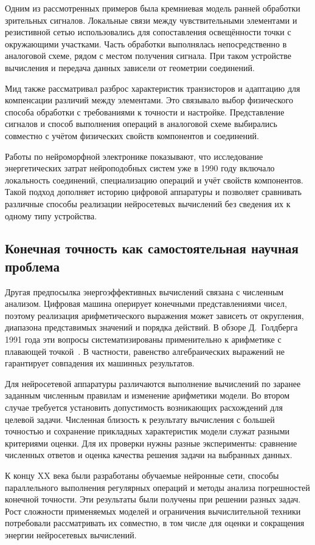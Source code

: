 Одним из рассмотренных примеров была кремниевая модель
ранней обработки зрительных сигналов. Локальные связи
между чувствительными элементами и резистивной сетью
использовались для сопоставления освещённости точки
с окружающими участками. Часть обработки выполнялась
непосредственно в аналоговой схеме, рядом с местом
получения сигнала. При таком устройстве вычисления
и передача данных зависели от геометрии соединений.

Мид также рассматривал разброс характеристик транзисторов
и адаптацию для компенсации различий между элементами.
Это связывало выбор физического способа обработки
с требованиями к точности и настройке. Представление сигналов
и способ выполнения операций в аналоговой схеме выбирались
совместно с учётом физических свойств компонентов и соединений.

Работы по нейроморфной электронике показывают,
что исследование энергетических затрат нейроподобных
систем уже в 1990 году включало локальность соединений,
специализацию операций и учёт свойств компонентов.
Такой подход дополняет историю цифровой аппаратуры
и позволяет сравнивать различные способы реализации
нейросетевых вычислений без сведения их к одному типу устройства.

\subsection{Конечная точность как самостоятельная научная проблема}

Другая предпосылка энергоэффективных вычислений связана с численным анализом.
Цифровая машина оперирует конечными представлениями чисел, поэтому
реализация арифметического выражения может зависеть от округления,
диапазона представимых значений и порядка действий. В обзоре Д.~Голдберга
1991 года эти вопросы систематизированы применительно к арифметике
с плавающей точкой~\cite{goldberg1991}. В частности, равенство
алгебраических выражений не гарантирует совпадения их машинных результатов.

Для нейросетевой аппаратуры различаются выполнение вычислений по заранее
заданным численным правилам и изменение арифметики модели. Во втором случае требуется установить допустимость возникающих
расхождений для целевой задачи. Численная близость к результату вычисления
с большей точностью и сохранение прикладных характеристик модели
служат разными критериями оценки. Для их проверки нужны разные эксперименты:
сравнение численных ответов и оценка качества решения задачи на выбранных
данных.

К концу XX века были разработаны обучаемые нейронные сети, способы
параллельного выполнения регулярных операций и методы анализа погрешностей
конечной точности. Эти результаты были получены при решении разных задач. Рост
сложности применяемых моделей и ограничения вычислительной техники потребовали
рассматривать их совместно, в том числе для оценки и сокращения энергии
нейросетевых вычислений.
